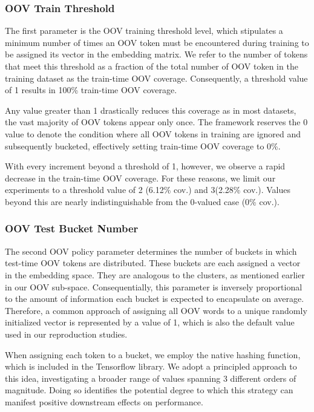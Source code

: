 \documentclass[../../fyp.tex]{subfiles}
\begin{document}
\subsubsection{OOV Train Threshold}
The first parameter is the OOV training threshold level, which stipulates a minimum number of times an OOV token must be encountered during training to be assigned its vector in the embedding matrix. We refer to the number of tokens that meet this threshold as a fraction of the total number of OOV token in the training dataset as the train-time OOV coverage. Consequently, a threshold value of 1 results in 100\% train-time OOV coverage. 

Any value greater than 1 drastically reduces this coverage as in most datasets, the vast majority of OOV tokens appear only once. The framework reserves the 0 value to denote the condition where all OOV tokens in training are ignored and subsequently bucketed, effectively setting train-time OOV coverage to 0\%.

With every increment beyond a threshold of 1, however, we observe a rapid decrease in the train-time OOV coverage. For these reasons, we limit our experiments to a threshold value of 2 (6.12\% cov.) and 3(2.28\% cov.). Values beyond this are nearly indistinguishable from the 0-valued case (0\% cov.). 

\subsubsection{OOV Test Bucket Number}
The second OOV policy parameter determines the number of buckets in which test-time OOV tokens are distributed. These buckets are each assigned a vector in the embedding space. They are analogous to the clusters, as mentioned earlier in our OOV sub-space. Consequentially, this parameter is inversely proportional to the amount of information each bucket is expected to encapsulate on average. Therefore, a common approach of assigning all OOV words to a unique randomly initialized vector is represented by a value of 1, which is also the default value used in our reproduction studies. 

When assigning each token to a bucket, we employ the native hashing function, which is included in the Tensorflow library. 
We adopt a principled approach to this idea, investigating a broader range of values spanning 3 different orders of magnitude. Doing so identifies the potential degree to which this strategy can manifest positive downstream effects on performance. 
\end{document}
